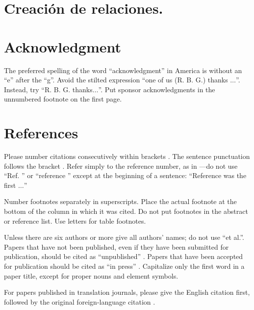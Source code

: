 \documentclass[conference]{IEEEtran}
\begin{document}
\section{Creación de relaciones.}



\section*{Acknowledgment}

The preferred spelling of the word ``acknowledgment'' in America is without 
an ``e'' after the ``g''. Avoid the stilted expression ``one of us (R. B. 
G.) thanks $\ldots$''. Instead, try ``R. B. G. thanks$\ldots$''. Put sponsor 
acknowledgments in the unnumbered footnote on the first page.

\section*{References}

Please number citations consecutively within brackets \cite{b1}. The 
sentence punctuation follows the bracket \cite{b2}. Refer simply to the reference 
number, as in \cite{b3}---do not use ``Ref. \cite{b3}'' or ``reference \cite{b3}'' except at 
the beginning of a sentence: ``Reference \cite{b3} was the first $\ldots$''

Number footnotes separately in superscripts. Place the actual footnote at 
the bottom of the column in which it was cited. Do not put footnotes in the 
abstract or reference list. Use letters for table footnotes.

Unless there are six authors or more give all authors' names; do not use 
``et al.''. Papers that have not been published, even if they have been 
submitted for publication, should be cited as ``unpublished'' \cite{b4}. Papers 
that have been accepted for publication should be cited as ``in press'' \cite{b5}. 
Capitalize only the first word in a paper title, except for proper nouns and 
element symbols.

For papers published in translation journals, please give the English 
citation first, followed by the original foreign-language citation \cite{b6}.
\end{document}
